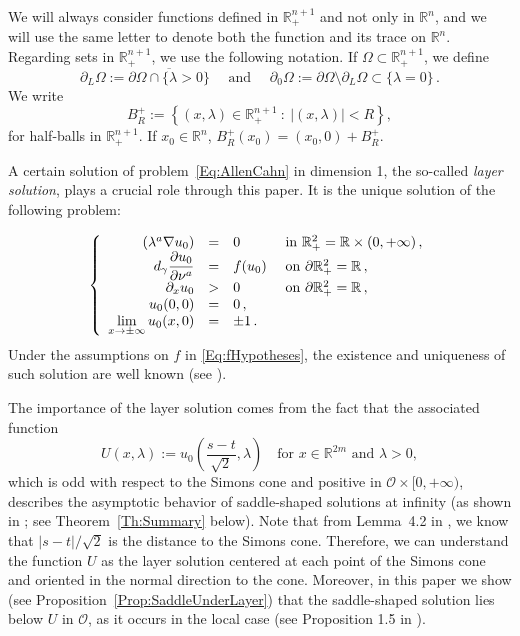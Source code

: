 \documentclass[12pt,reqno]{amsart}
\theoremstyle{definition}
\theoremstyle{remark}
\newcommand{\con}[1]{\mathbb{#1}}
\newcommand{\R}{\con{R}} %
\newcommand{\ocal}{\mathcal{O}}
\newcommand{\s}{\gamma}
\newcommand{\setcond}[2]{\left \{ #1 \ : \ #2  \right \}}
\newcommand\beqc[1]{\left\{\begin{array}{#1}}
\newcommand\eeqc{\end{array} \right.}
\def\PDEsystem{rcll}
\let\div\relax
\DeclareMathOperator{\div}{div}
\def\ds{\displaystyle}
\numberwithin{equation}{section}
\begin{document}
We will always consider functions defined in $\R^{n+1}_+$ and not only in $\R^n$, and we will use the same letter to denote both the function and its trace on $\R^n$. Regarding sets in $\R^{n+1}_+$, we use the following notation. If $\Omega \subset \R^{n+1}_+$, we define
$$
\partial_L \Omega := \overline{\partial \Omega \cap \{\lambda > 0\}}
 \quad \text{ and } \quad \partial_0 \Omega := \partial \Omega \setminus \partial_L \Omega \subset \{\lambda = 0\}\,.
$$
We write
$$
B_{R}^+ := \setcond{(x,\lambda)\in \R^{n+1}_+}{|(x,\lambda)|< R},
$$
for half-balls in $\R^{n+1}_+$. If $x_0\in \R^n$, $B_{R}^+(x_0)=(x_0,0)+B_{R}^+$.


A certain solution of problem~\eqref{Eq:AllenCahn} in dimension 1, the so-called \emph{layer solution}, plays a crucial role through this paper. It is the unique solution of the following problem:

\begin{equation}
\label{Eq:LayerSolution}
\beqc{\PDEsystem}
\div(\lambda^a \nabla u_0) &=& 0 & \textrm{ in } \R^{2}_+ = \R \times (0, +\infty)\,, \\
d_\s \dfrac{\partial u_0}{\partial \nu^a} &=& f(u_0) & \textrm{ on } \partial \R^{2}_+ = \R\,,\\
\partial_x u_0 &>& 0 & \textrm{ on } \partial \R^{2}_+ = \R\,,\\
u_0 (0,0) &=& 0 \,,\\
\ds \lim_{x\to\pm \infty} u_0 (x,0) &=& \pm 1\,.
\eeqc
\end{equation}
Under the assumptions on $f$ in \eqref{Eq:fHypotheses}, the existence and uniqueness of such solution are well known (see \cite{CabreSireI}).

The importance of the layer solution comes from the fact that the associated function
\begin{equation}
\label{Eq:DefULayer}
U(x,\lambda) := u_0\left( \frac{s-t}{\sqrt{2}},\lambda \right) \ \ \ \text{ for } x\in\R^{2m} \text{ and } \lambda>0,
\end{equation}
which is odd with respect to the Simons cone and positive in $\ocal\times [0,+\infty)$, describes the asymptotic behavior of saddle-shaped solutions at infinity (as shown in \cite{Cinti-Saddle, Cinti-Saddle2}; see Theorem~\ref{Th:Summary} below).  Note that from Lemma~4.2 in \cite{CabreTerraI}, we know that $|s-t|/\sqrt{2}$ is the distance to the Simons cone. Therefore, we can understand the function $U$ as the layer solution centered at each point of the Simons cone and oriented in the normal direction to the cone. Moreover, in this paper we  show (see Proposition~\ref{Prop:SaddleUnderLayer}) that the saddle-shaped solution lies below $U$ in $\ocal$, as it occurs in the local case (see Proposition 1.5 in \cite{CabreTerraI}).
\end{document}
